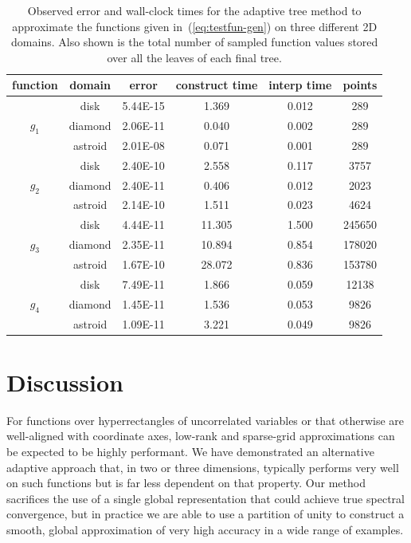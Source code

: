 \begin{table}
\begin{tabular}{c|c|c|c|c|c}
function & domain & error & construct time & interp time & points \\ [5pt] \hline
\multirow{3}{*}{ $g_1$ } & disk & 5.44E-15 & 1.369 & 0.012 & 289 \\
& diamond & 2.06E-11 & 0.040 & 0.002 & 289 \\
& astroid & 2.01E-08 & 0.071 & 0.001 & 289 \\ \hline
\multirow{3}{*}{ $g_2$ } & disk & 2.40E-10 & 2.558 & 0.117 & 3757 \\
& diamond & 2.40E-11 & 0.406 & 0.012 & 2023 \\
& astroid & 2.14E-10 & 1.511 & 0.023 & 4624 \\ \hline
\multirow{3}{*}{ $g_3$ } & disk & 4.44E-11 & 11.305 & 1.500 & 245650 \\
& diamond & 2.35E-11 & 10.894 & 0.854 & 178020 \\
& astroid & 1.67E-10 & 28.072 & 0.836 & 153780 \\ \hline
\multirow{3}{*}{ $g_4$ } & disk & 7.49E-11 & 1.866 & 0.059 & 12138 \\
& diamond & 1.45E-11 & 1.536 & 0.053 & 9826 \\
& astroid & 1.09E-11 & 3.221 & 0.049 & 9826 \\
\end{tabular}
  \caption{Observed error and wall-clock times for the adaptive tree method to approximate the functions given in~(\ref{eq:testfun-gen}) on three different 2D domains. Also shown is the total number of sampled function values stored over all the leaves of each final tree.}
  \label{table_general}
\end{table}


\section{Discussion}
\label{sec:conclusion}

For functions over hyperrectangles of uncorrelated variables or that otherwise are well-aligned with coordinate axes, low-rank and sparse-grid approximations can be expected to be highly performant. We have demonstrated an alternative adaptive approach that, in two or three dimensions, typically performs very well on such functions but is far less dependent on that property. Our method sacrifices the use of a single global representation that could achieve true spectral convergence, but in practice we are able to use a partition of unity to construct a smooth, global approximation of very high accuracy in a wide range of examples. 

